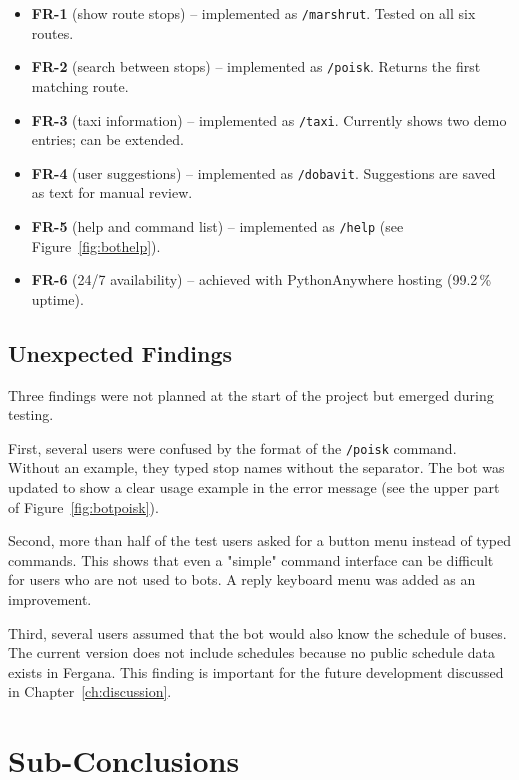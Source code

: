 \begin{itemize}
    \item \textbf{FR-1} (show route stops) -- implemented as
        \texttt{/marshrut}. Tested on all six routes.
    \item \textbf{FR-2} (search between stops) -- implemented as
        \texttt{/poisk}. Returns the first matching route.
    \item \textbf{FR-3} (taxi information) -- implemented as
        \texttt{/taxi}. Currently shows two demo entries; can be extended.
    \item \textbf{FR-4} (user suggestions) -- implemented as
        \texttt{/dobavit}. Suggestions are saved as text for manual review.
    \item \textbf{FR-5} (help and command list) -- implemented as
        \texttt{/help} (see Figure~\ref{fig:bothelp}).
    \item \textbf{FR-6} (24/7 availability) -- achieved with
        PythonAnywhere hosting (99.2\,\% uptime).
\end{itemize}

\subsection{Unexpected Findings}
\label{subsec:unexpected}

Three findings were not planned at the start of the project but emerged
during testing.

First, several users were confused by the format of the \texttt{/poisk}
command. Without an example, they typed stop names without the separator.
The bot was updated to show a clear usage example in the error message
(see the upper part of Figure~\ref{fig:botpoisk}).

Second, more than half of the test users asked for a button menu instead
of typed commands. This shows that even a "simple" command interface can
be difficult for users who are not used to bots. A reply keyboard menu was
added as an improvement.

Third, several users assumed that the bot would also know the schedule of
buses. The current version does not include schedules because no public
schedule data exists in Fergana. This finding is important for the future
development discussed in Chapter~\ref{ch:discussion}.\cite{nielsen2020usability, following2019messaging}


\section{Sub-Conclusions}
\label{sec:ch3-subconclusions}

